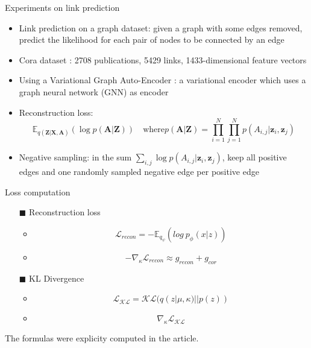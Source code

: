 \begin{frame}{Experiments on link prediction}

  \begin{itemize}
    \item Link prediction on a graph dataset: given a graph with some edges removed, predict the likelihood
    for each pair of nodes to be connected by an edge
    \item Cora dataset \cite{McCallum_2000}: 2708 publications, 5429 links, 1433-dimensional feature vectors
    \item Using a Variational Graph Auto-Encoder \cite{kipf_variational_2016}: a variational encoder which uses a
    graph neural network (GNN) as encoder
    \item Reconstruction loss:
        $$ \mathbb{E}_{q(\mathbf{Z}|\mathbf{X}, \mathbf{A})}(\log p(\mathbf{A}|\mathbf{Z})) \quad 
        \text{where} p(\mathbf{A}|\mathbf{Z}) = \prod_{i = 1}^N \prod_{j=1}^N p(A_{i, j}|\mathbf{z}_i, \mathbf{z}_j) $$
    \item Negative sampling: in the sum $\sum_{i, j} \log p(A_{i, j}|\mathbf{z}_i, \mathbf{z}_j)$, keep all
    positive edges and one randomly sampled negative edge per positive edge
  \end{itemize}
\end{frame}


\begin{frame}{Loss computation}

  \begin{itemize}
    \item[$\blacksquare$] Reconstruction loss
      \begin{itemize}
        \item $$\mathcal{L}_{recon} =  - \mathbb{E}_{q_{\psi}}( log\ p_{\phi}(x | z)) $$
        \item$$ -\nabla_{\kappa} \mathcal{L}_{recon} \approx g_{recon} + g_{cor} $$ 
      \end{itemize}
    \item[$\blacksquare$] KL Divergence 
        \begin{itemize}
          \item $$ \mathcal{L}_{\mathcal{KL}} = \mathcal{KL}(q(z|\mu, \kappa) || p(z)) $$
          \item $$ \nabla_{\kappa} \mathcal{L}_{\mathcal{KL}} $$
        \end{itemize}
  \end{itemize}
  The formulas were explicity computed in the article.
  
\end{frame}
